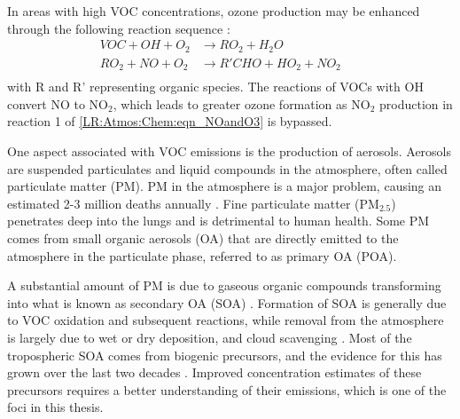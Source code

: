   
  
  In areas with high VOC concentrations, ozone production may be enhanced through the following reaction sequence \parencite{Sillman1999}:
  \begin{equation}
    \begin{aligned}
      VOC + OH + O_2   & \to RO_2 + H_2O       && \\%
      RO_2 + NO + O_2  & \to R'CHO+HO_2+NO_2   && \\%
    \end{aligned}
    \label{LR:VOCs:eqn_VOCandNO}
  \end{equation}
  with R and R' representing organic species.
  The reactions of VOCs with OH convert NO to NO$_2$, which leads to greater ozone formation as NO$_2$ production in reaction 1 of \ref{LR:Atmos:Chem:eqn_NOandO3} is bypassed.
  
  One aspect associated with VOC emissions is the production of aerosols.
  Aerosols are suspended particulates and liquid compounds in the atmosphere, often called particulate matter (PM).
  PM in the atmosphere is a major problem, causing an estimated 2-3 million 
  deaths annually \parencite{Avnery2011, Hoek2013, Krewski2009, Silva2013, 
  Lelieveld2015}. 
  Fine particulate matter (PM$_{2.5}$) penetrates deep into the lungs and is detrimental to human health.
  Some PM comes from small organic aerosols (OA) that are directly emitted to 
  the atmosphere in the particulate phase, referred to as primary OA (POA).
  
  A substantial amount of PM is due to gaseous organic compounds transforming 
  into what is known as secondary OA (SOA) \parencite{Atkinson2000, 
  Kanakidou2005, Kroll2008}.
  Formation of SOA is generally due to VOC oxidation and subsequent reactions, while removal from the atmosphere is largely due to wet or dry deposition, and cloud scavenging \parencite{Kanakidou2005}.
  Most of the tropospheric SOA comes from biogenic precursors, and the evidence 
  for this has grown over the last two decades \parencite{Guenther1995, 
  Kanakidou2005, Guenther2012}.
  Improved concentration estimates of these precursors requires a better understanding of their emissions, which is one of the foci in this thesis.
  
